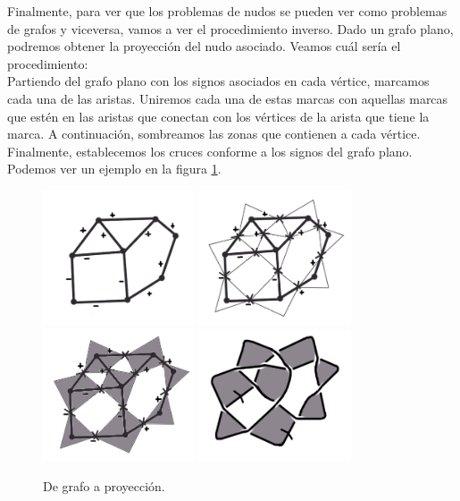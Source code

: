 \documentclass[14pt]{extarticle}
\begin{document}
Finalmente, para ver que los problemas de nudos se pueden ver como problemas de grafos y viceversa, vamos a ver el procedimiento inverso. Dado un grafo plano, podremos obtener la proyección del nudo asociado. Veamos cuál sería el procedimiento:\\

Partiendo del grafo plano con los signos asociados en cada vértice, marcamos cada una de las aristas. Uniremos cada una de estas marcas con aquellas marcas que estén en las aristas que conectan con los vértices de la arista que tiene la marca. A continuación, sombreamos las zonas que contienen a cada vértice. Finalmente, establecemos los cruces conforme a los signos del grafo plano. Podemos ver un ejemplo en la figura \ref{graf3}.\\
\begin{figure}[h!]
	\centering
	\includegraphics[width=4.5cm]{inudos/grafo1.png}
	\includegraphics[width=4.5cm]{inudos/grafo2.png}
	\includegraphics[width=4.5cm]{inudos/grafo3.png}
	\includegraphics[width=4.5cm]{inudos/grafo4.png}
	\caption{De grafo a proyección.}
	\label{graf3} 
\end{figure}
\end{document}
